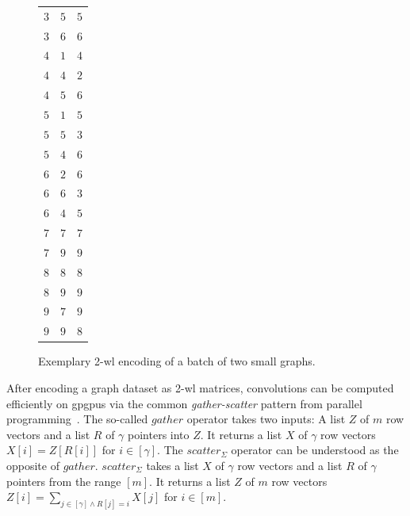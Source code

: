 \begin{figure}[t]
{\begin{tabu}{c c c}
		\rowfont{\color{t_blue}}$3$ & $5$ & $5$ \\
		\rowfont{\color{t_blue}}$3$ & $6$ & $6$ \\
		\rowfont{\color{t_red}}$4$ & $1$ & $4$ \\
		\rowfont{\color{t_red}}$4$ & $4$ & $2$ \\
		\rowfont{\color{t_red}}$4$ & $5$ & $6$ \\
		\rowfont{\color{t_red}}$5$ & $1$ & $5$ \\
		\rowfont{\color{t_red}}$5$ & $5$ & $3$ \\
		\rowfont{\color{t_red}}$5$ & $4$ & $6$ \\
		\rowfont{\color{t_red}}$6$ & $2$ & $6$ \\
		\rowfont{\color{t_red}}$6$ & $6$ & $3$ \\
		\rowfont{\color{t_red}}$6$ & $4$ & $5$ \\
		\midrule
		\rowfont{\color{t_blue}}$7$ & $7$ & $7$ \\
		\rowfont{\color{t_blue}}$7$ & $9$ & $9$ \\
		\rowfont{\color{t_blue}}$8$ & $8$ & $8$ \\
		\rowfont{\color{t_blue}}$8$ & $9$ & $9$ \\
		\rowfont{\color{t_red}}$9$ & $7$ & $9$ \\
		\rowfont{\color{t_red}}$9$ & $9$ & $8$
	\end{tabu}%
	}\caption{
		Exemplary 2-\acs{wl} encoding of a batch of two small graphs.
	}\label{fig:ltd:wl2-encoding}
\end{figure}
After encoding a graph dataset as 2-\acs{wl} matrices, convolutions can be computed efficiently on \acp{gpgpu} via the common \textit{gather-scatter} pattern from parallel programming~\cite{He2007}.
The so-called $\mathit{gather}$ operator takes two inputs: A list $Z$ of $m$ row vectors and a list $R$ of $\gamma$ pointers into $Z$.
It returns a list $X$ of $\gamma$ row vectors $X[i] = Z[R[i]]$ for $i \in [\gamma]$.
The $\mathit{scatter}_{\Sigma}$ operator can be understood as the opposite of $\mathit{gather}$.
$\mathit{scatter}_{\Sigma}$ takes a list $X$ of $\gamma$ row vectors and a list $R$ of $\gamma$ pointers from the range $[m]$.
It returns a list $Z$ of $m$ row vectors $Z[i] = \sum_{j \in [\gamma] \land R[j] = i} X[j]$ for $i \in [m]$.

